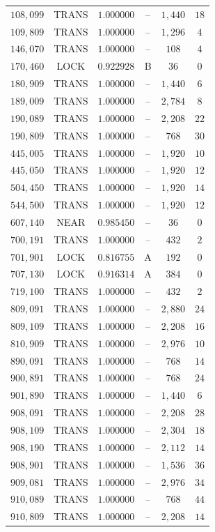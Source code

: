 \documentclass[11pt,letterpaper]{article}
\theoremstyle{paperstyle}
\theoremstyle{paperstyledef}
\theoremstyle{paperstylerem}
\begin{document}
\begin{longtable}[]{@{}cccccc@{}}
\(108{,}099\) & TRANS & \(1.000000\) & -- & \(1{,}440\) & \(18\) \\
\(109{,}809\) & TRANS & \(1.000000\) & -- & \(1{,}296\) & \(4\) \\
\(146{,}070\) & TRANS & \(1.000000\) & -- & \(108\) & \(4\) \\
\(170{,}460\) & LOCK & \(0.922928\) & B & \(36\) & \(0\) \\
\(180{,}909\) & TRANS & \(1.000000\) & -- & \(1{,}440\) & \(6\) \\
\(189{,}009\) & TRANS & \(1.000000\) & -- & \(2{,}784\) & \(8\) \\
\(190{,}089\) & TRANS & \(1.000000\) & -- & \(2{,}208\) & \(22\) \\
\(190{,}809\) & TRANS & \(1.000000\) & -- & \(768\) & \(30\) \\
\(445{,}005\) & TRANS & \(1.000000\) & -- & \(1{,}920\) & \(10\) \\
\(445{,}050\) & TRANS & \(1.000000\) & -- & \(1{,}920\) & \(12\) \\
\(504{,}450\) & TRANS & \(1.000000\) & -- & \(1{,}920\) & \(14\) \\
\(544{,}500\) & TRANS & \(1.000000\) & -- & \(1{,}920\) & \(12\) \\
\(607{,}140\) & NEAR & \(0.985450\) & -- & \(36\) & \(0\) \\
\(700{,}191\) & TRANS & \(1.000000\) & -- & \(432\) & \(2\) \\
\(701{,}901\) & LOCK & \(0.816755\) & A & \(192\) & \(0\) \\
\(707{,}130\) & LOCK & \(0.916314\) & A & \(384\) & \(0\) \\
\(719{,}100\) & TRANS & \(1.000000\) & -- & \(432\) & \(2\) \\
\(809{,}091\) & TRANS & \(1.000000\) & -- & \(2{,}880\) & \(24\) \\
\(809{,}109\) & TRANS & \(1.000000\) & -- & \(2{,}208\) & \(16\) \\
\(810{,}909\) & TRANS & \(1.000000\) & -- & \(2{,}976\) & \(10\) \\
\(890{,}091\) & TRANS & \(1.000000\) & -- & \(768\) & \(14\) \\
\(900{,}891\) & TRANS & \(1.000000\) & -- & \(768\) & \(24\) \\
\(901{,}890\) & TRANS & \(1.000000\) & -- & \(1{,}440\) & \(6\) \\
\(908{,}091\) & TRANS & \(1.000000\) & -- & \(2{,}208\) & \(28\) \\
\(908{,}109\) & TRANS & \(1.000000\) & -- & \(2{,}304\) & \(18\) \\
\(908{,}190\) & TRANS & \(1.000000\) & -- & \(2{,}112\) & \(14\) \\
\(908{,}901\) & TRANS & \(1.000000\) & -- & \(1{,}536\) & \(36\) \\
\(909{,}081\) & TRANS & \(1.000000\) & -- & \(2{,}976\) & \(34\) \\
\(910{,}089\) & TRANS & \(1.000000\) & -- & \(768\) & \(44\) \\
\(910{,}809\) & TRANS & \(1.000000\) & -- & \(2{,}208\) & \(14\) \\
\end{longtable}
\end{document}
